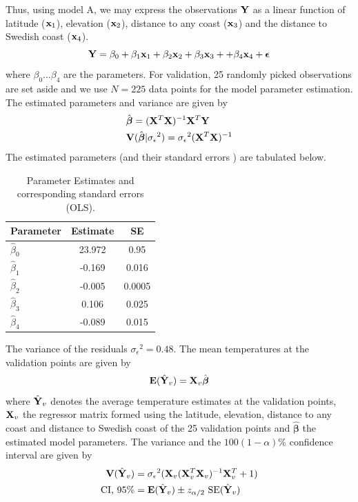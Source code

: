 \documentclass[a4paper,10pt]{article}
\def\bY{{\bf Y}}
\def\bX{{\bf X}}
\def\bE{{\bf E}}
\def\bV{{\bf V}}
\def\bx{{\bf x}}
\def\bbeta{{\boldsymbol \beta}}
\def\sigmaeps{{\sigma_{\epsilon}}}
\begin{document}
Thus, using model A, we may express the observations $\bY$ as a linear function of latitude ($\bx_1$), elevation ($\bx_2$), distance to any coast ($\bx_3$) and the distance to Swedish coast ($\bx_4$).
\begin{equation}
 \bY = \beta_0 + \beta_1 \bx_1 + \beta_2 \bx_2 + \beta_3 \bx_3 + + \beta_4 \bx_4 + {\boldsymbol \epsilon}
\end{equation}
where $\beta_0 \dots \beta_4$ are the parameters. For  validation, 25 randomly picked observations are set aside and we use $N = 225$ data points for the model parameter estimation. The estimated parameters and variance are given by
\begin{align*}
& \hat \bbeta = (\bX^T \bX)^{-1} \bX^T \bY\\
& \bV(\hat \bbeta | \sigmaeps^2) = \sigmaeps^2 (\bX^T \bX)^{-1}
\end{align*}
 The estimated parameters (and their standard errors ) are tabulated below.
\begin{table}[H]
\centering
\begin{tabular}{lcc}
\hline
{\bf Parameter} & {\bf Estimate} & {\bf SE }\\
\hline
$\hat \beta_0$ & 23.972 & 0.95 \\
$\hat \beta_1$ & -0.169 & 0.016\\
$\hat \beta_2$ & -0.005 & 0.0005 \\
$\hat \beta_3$ & 0.106 & 0.025\\
$\hat \beta_4$ & -0.089 & 0.015\\
\hline
\end{tabular}
\caption{Parameter Estimates and corresponding standard errors (OLS).}
\label{tab:olsest}
\end{table}
The variance of the residuals $\sigmaeps^2 = 0.48$. The mean temperatures at the validation points are given by
\begin{equation}
\bE(\hat \bY_v) = \bX_v \hat \bbeta
\end{equation}
where $\hat \bY_v$ denotes the average temperature estimates at the validation points, $\bX_v$  the regressor matrix formed using the latitude, elevation, distance to any coast and distance to Swedish coast of the 25 validation points and $\hat \bbeta$ the estimated model parameters. The variance and the $100(1-\alpha)$\% confidence interval are given by
\begin{align*}
\bV(\hat \bY_v) &= \sigmaeps^2 (\bX_v (\bX_v^T\bX_v)^{-1} \bX_v^T + 1) \\
\text{CI, 95\%} &= \bE(\hat \bY_v) \pm z_{\alpha/2} \text{ SE}(\hat \bY_v)
\end{align*}
\end{document}
